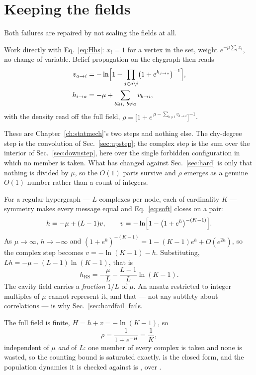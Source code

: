 \section{Keeping the fields}
\label{sec:soft}

Both failures are repaired by not scaling the fields at all.

Work directly with Eq.~\eqref{eq:Hhs}: $x_{i}=1$ for a vertex in the set, weight
$e^{-\mu\sum_{i}x_{i}}$, no change of variable. Belief propagation on the
chygraph then reads
\begin{align}
  v_{a\to i}&=-\ln\Bigl[1-\prod_{j\in a\setminus i}
                \bigl(1+e^{h_{j\to a}}\bigr)^{-1}\Bigr],\nonumber\\
  h_{i\to a}&=-\mu+\sum_{b\ni i,\ b\ne a}v_{b\to i},
  \label{eq:soft}
\end{align}
with the density read off the full field,
$\rho=\bigl[1+e^{\,\mu-\sum_{b\ni i}v_{b\to i}}\bigr]^{-1}$.

These are Chapter~\ref{ch:statmech}'s two steps and nothing else. The chy-degree
step is the convolution of Sec.~\ref{sec:upstep}; the complex step is the sum
over the interior of Sec.~\ref{sec:downstep}, here over the single forbidden
configuration in which no member is taken. What has changed against
Sec.~\ref{sec:hard} is only that nothing is divided by $\mu$, so the $O(1)$
parts survive and $\rho$ emerges as a genuine $O(1)$ number rather than a count
of integers.

For a regular hypergraph --- $L$ complexes per node, each of cardinality $K$ ---
symmetry makes every message equal and Eq.~\eqref{eq:soft} closes on a pair:
\[
  h=-\mu+(L-1)v,
  \qquad
  v=-\ln\Bigl[1-\bigl(1+e^{h}\bigr)^{-(K-1)}\Bigr].
\]
As $\mu\to\infty$, $h\to-\infty$ and
$(1+e^{h})^{-(K-1)}=1-(K-1)e^{h}+O(e^{2h})$, so the complex step becomes
$v=-\ln(K-1)-h$. Substituting, $Lh=-\mu-(L-1)\ln(K-1)$, that is
\begin{equation}
  h_{\mathrm{RS}}=-\frac{\mu}{L}-\frac{L-1}{L}\ln(K-1).
  \label{eq:hRS}
\end{equation}
The cavity field carries a \emph{fraction} $1/L$ of $\mu$. An ansatz restricted to integer multiples of $\mu$ cannot represent it,
and that --- not any subtlety about correlations --- is why
Sec.~\ref{sec:hardfail} fails.

The full field is finite, $H=h+v=-\ln(K-1)$, so
\[
  \rho=\frac{1}{1+e^{-H}}=\frac1K,
\]
independent of $\mu$ \emph{and} of $L$: one member of every complex is taken and
none is wasted, so the counting bound is saturated exactly.  is the closed form,
and the population dynamics it is checked against is
, over
.

